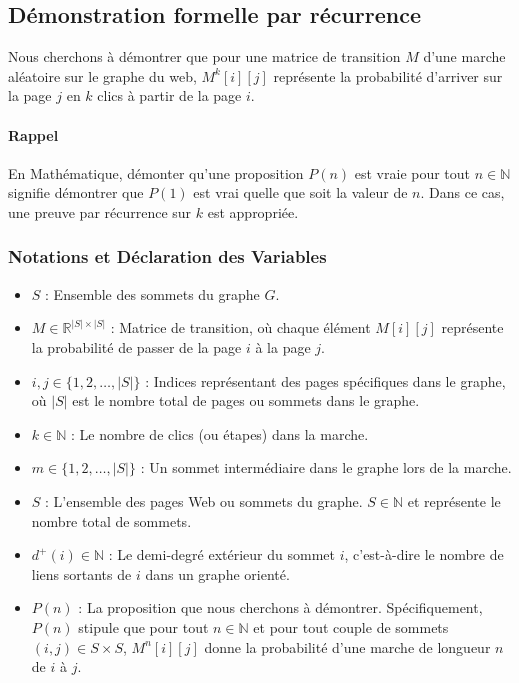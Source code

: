 \subsection{Démonstration formelle par récurrence}

Nous cherchons à démontrer que pour une matrice de transition $M$ d'une marche aléatoire sur le graphe du web, $M^k[i][j]$ représente la probabilité d'arriver sur la page $j$ en $k$ clics à partir de la page $i$.

\paragraph*{Rappel}
En Mathématique, démonter qu'une proposition $P(n)$ est vraie pour tout $n \in \mathbb{N}$ signifie démontrer que $P(1)$ est vrai quelle que soit la valeur de $n$. Dans ce cas, une preuve par récurrence sur $k$ est appropriée.

\subsubsection{Notations et Déclaration des Variables}\label{sec:notations_part_1}

\begin{itemize}
    \item $S$ : Ensemble des sommets du graphe $G$.
    \item $M \in \mathbb{R}^{|S| \times |S|}$ : Matrice de transition, où chaque élément $M[i][j]$ représente la probabilité de passer de la page $i$ à la page $j$.
    \item $i, j \in \{1, 2, \ldots, |S|\}$ : Indices représentant des pages spécifiques dans le graphe, où $|S|$ est le nombre total de pages ou sommets dans le graphe.
    \item $k \in \mathbb{N}$ : Le nombre de clics (ou étapes) dans la marche.
    \item $m \in \{1, 2, \ldots, |S|\}$ : Un sommet intermédiaire dans le graphe lors de la marche.
    \item $S$ : L'ensemble des pages Web ou sommets du graphe. $S \in \mathbb{N}$ et représente le nombre total de sommets.
    \item $d^+(i) \in \mathbb{N}$ : Le demi-degré extérieur du sommet $i$, c'est-à-dire le nombre de liens sortants de $i$ dans un graphe orienté.
    \item $P(n)$ : La proposition que nous cherchons à démontrer. Spécifiquement, $P(n)$ stipule que pour tout $n \in \mathbb{N}$ et pour tout couple de sommets $(i, j) \in S \times S$, $M^n[i][j]$ donne la probabilité d'une marche de longueur $n$ de $i$ à $j$.
\end{itemize}

